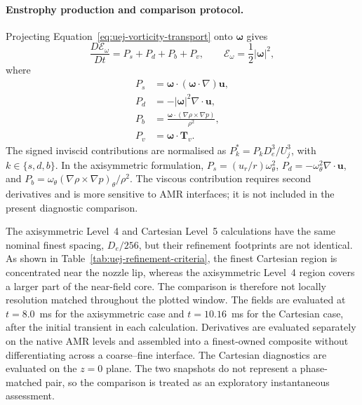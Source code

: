 \paragraph{Enstrophy production and comparison protocol.}
Projecting Equation~\eqref{eq:uej-vorticity-transport} onto
\(\boldsymbol{\omega}\) gives
\begin{equation}
    \frac{D\mathcal{E}_\omega}{Dt}
    =P_s+P_d+P_b+P_v,
    \qquad
    \mathcal{E}_\omega=\frac{1}{2}|\boldsymbol{\omega}|^2,
    \label{eq:uej-enstrophy-transport}
\end{equation}
where
\begin{equation}
\begin{aligned}
    P_s&=\boldsymbol{\omega}\cdot
        (\boldsymbol{\omega}\cdot\nabla)\boldsymbol{u},\\
    P_d&=-|\boldsymbol{\omega}|^2\nabla\cdot\boldsymbol{u},\\
    P_b&=\frac{\boldsymbol{\omega}\cdot
        (\nabla\rho\times\nabla p)}{\rho^2},\\
    P_v&=\boldsymbol{\omega}\cdot\boldsymbol{T}_v.
\end{aligned}
    \label{eq:uej-enstrophy-terms}
\end{equation}
The signed inviscid contributions are normalised as
\(P_k^*=P_kD_e^3/U_j^3\), with \(k\in\{s,d,b\}\). In the axisymmetric
formulation,
\(P_s=(u_r/r)\omega_\theta^2\),
\(P_d=-\omega_\theta^2\nabla\cdot\boldsymbol{u}\), and
\(P_b=\omega_\theta(\nabla\rho\times\nabla p)_\theta/\rho^2\).
The viscous contribution requires second derivatives and is more sensitive to
AMR interfaces; it is not included in the present diagnostic comparison.

The axisymmetric Level~4 and Cartesian Level~5 calculations have the same
nominal finest spacing, \(D_e/256\), but their refinement footprints are not
identical. As shown in Table~\ref{tab:uej-refinement-criteria}, the finest
Cartesian region is concentrated near the nozzle lip, whereas the
axisymmetric Level~4 region covers a larger part of the near-field core. The
comparison is therefore not locally resolution matched throughout the plotted
window. The fields are evaluated at \(t=8.0\)~ms for the axisymmetric case and
\(t=10.16\)~ms for the Cartesian case, after the initial transient in each
calculation. Derivatives are evaluated separately on the native AMR levels and
assembled into a finest-owned composite without differentiating across a
coarse--fine interface. The Cartesian diagnostics are evaluated on the
\(z=0\) plane. The two snapshots do not represent a phase-matched pair, so the
comparison is treated as an exploratory instantaneous assessment.

